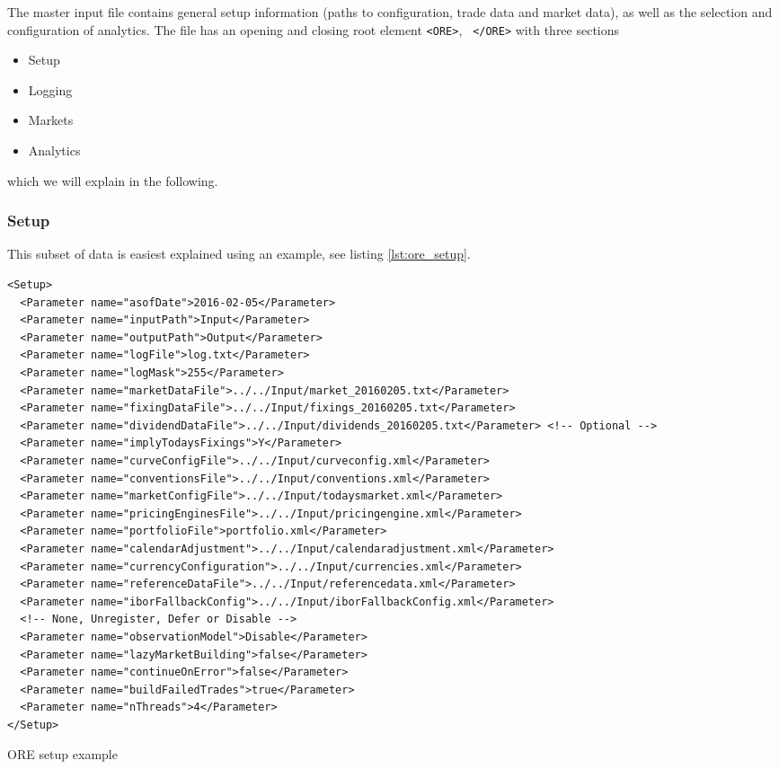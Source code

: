 \documentclass[12pt, a4paper]{article}
\begin{document}
The master input file contains general setup information (paths to configuration, trade data and market data), as well
as the selection and configuration of analytics. The file has an opening and closing root element {\tt <ORE>}, {\tt
  </ORE>} with three sections
\begin{itemize}
\item Setup
\item Logging
\item Markets
\item Analytics
\end{itemize}
which we will explain in the following.

\subsubsection{Setup}

This subset of data is easiest explained using an example, see listing \ref{lst:ore_setup}.
\begin{listing}[H]
\begin{verbatim}
<Setup>
  <Parameter name="asofDate">2016-02-05</Parameter>
  <Parameter name="inputPath">Input</Parameter>
  <Parameter name="outputPath">Output</Parameter>
  <Parameter name="logFile">log.txt</Parameter>
  <Parameter name="logMask">255</Parameter>
  <Parameter name="marketDataFile">../../Input/market_20160205.txt</Parameter>
  <Parameter name="fixingDataFile">../../Input/fixings_20160205.txt</Parameter>
  <Parameter name="dividendDataFile">../../Input/dividends_20160205.txt</Parameter> <!-- Optional -->
  <Parameter name="implyTodaysFixings">Y</Parameter>
  <Parameter name="curveConfigFile">../../Input/curveconfig.xml</Parameter>
  <Parameter name="conventionsFile">../../Input/conventions.xml</Parameter>
  <Parameter name="marketConfigFile">../../Input/todaysmarket.xml</Parameter>
  <Parameter name="pricingEnginesFile">../../Input/pricingengine.xml</Parameter>
  <Parameter name="portfolioFile">portfolio.xml</Parameter>
  <Parameter name="calendarAdjustment">../../Input/calendaradjustment.xml</Parameter>
  <Parameter name="currencyConfiguration">../../Input/currencies.xml</Parameter>
  <Parameter name="referenceDataFile">../../Input/referencedata.xml</Parameter>
  <Parameter name="iborFallbackConfig">../../Input/iborFallbackConfig.xml</Parameter>
  <!-- None, Unregister, Defer or Disable -->
  <Parameter name="observationModel">Disable</Parameter>
  <Parameter name="lazyMarketBuilding">false</Parameter>
  <Parameter name="continueOnError">false</Parameter>
  <Parameter name="buildFailedTrades">true</Parameter>
  <Parameter name="nThreads">4</Parameter>
</Setup>
\end{verbatim}
\caption{ORE setup example}
\label{lst:ore_setup}
\end{listing}
\end{document}
